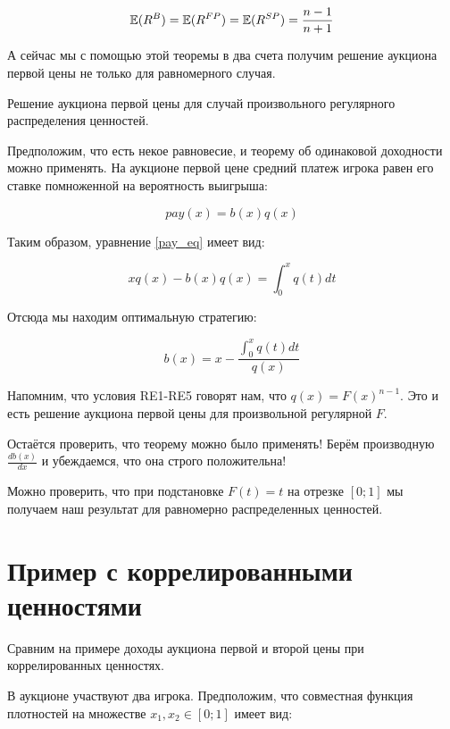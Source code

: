 \begin{equation}
\mathbb{E}(R^{B})=\mathbb{E}(R^{FP})=\mathbb{E}(R^{SP})=\frac{n-1}{n+1}
\end{equation}


А сейчас мы с помощью этой теоремы в два счета получим решение аукциона первой цены не только для равномерного случая.


\begin{myex} \label{use_ret} Решение аукциона первой цены для случай произвольного регулярного распределения ценностей.

Предположим, что есть некое равновесие, и теорему об одинаковой доходности можно применять. На аукционе первой цене средний платеж игрока равен его ставке помноженной на вероятность выигрыша:

\begin{equation}
\label{first_price_pay_eq}
pay(x)=b(x)q(x)
\end{equation}

Таким образом, уравнение \ref{pay_eq} имеет вид:

\begin{equation}
xq(x)-b(x)q(x)=\int_{0}^{x}q(t)dt
\end{equation}

Отсюда мы находим оптимальную стратегию:

\begin{equation}
\label{first_price_b_eq}
b(x)=x-\frac{\int_{0}^{x}q(t)dt}{q(x)}
\end{equation}

Напомним, что условия RE1-RE5 говорят нам, что $ q(x)=F(x)^{n-1} $. Это и есть решение аукциона первой цены для произвольной регулярной $ F $.

Остаётся проверить, что теорему можно было применять! Берём производную $ \frac{db(x)}{dx} $ и убеждаемся, что она строго положительна!

Можно проверить, что при подстановке $ F(t)=t $ на отрезке $ [0;1] $ мы получаем наш результат для равномерно распределенных ценностей.
\end{myex}




\section{Пример с коррелированными ценностями}


Сравним на примере доходы аукциона первой и второй цены при коррелированных ценностях.

В аукционе участвуют два игрока. Предположим, что совместная функция плотностей на множестве $ x_{1},x_{2}\in [0;1] $ имеет вид:

